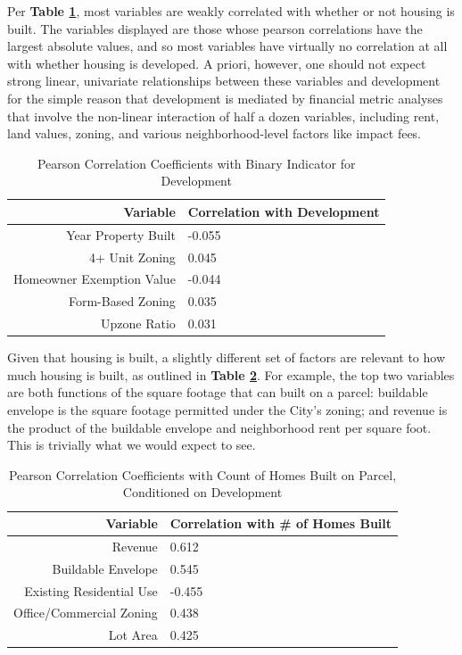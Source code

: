 \documentclass[a4paper,12pt]{article}
\begin{document}
Per \textbf{Table \ref{tab:correlation_with_developed}}, most variables are weakly correlated with whether or not housing is built. The variables displayed are those whose pearson correlations have the largest absolute values, and so most variables have virtually no correlation at all with whether housing is developed. A priori, however, one should not expect strong linear, univariate relationships between these variables and development for the simple reason that development is mediated by financial metric analyses that involve the non-linear interaction of half a dozen variables, including rent, land values, zoning, and various neighborhood-level factors like impact fees.\cite{la}\cite{metcalf2021will}




\renewcommand{\arraystretch}{1}

\begin{table}[hbt]
\centering
\caption{Pearson Correlation Coefficients with Binary Indicator for Development}
\setlength{\tabcolsep}{10pt} 
\begin{tabular}{r l}
\hline
\textbf{Variable} & \textbf{Correlation with Development} \\
\hline
Year Property Built & -0.055 \\
4+ Unit Zoning & 0.045 \\
Homeowner Exemption Value & -0.044 \\
Form-Based Zoning & 0.035 \\
Upzone Ratio & 0.031 \\
\hline
\end{tabular}
\label{tab:correlation_with_developed}
\end{table}
\renewcommand{\arraystretch}{1.5}

Given that housing is built, a slightly different set of factors are relevant to how much housing is built, as outlined in \textbf{Table \ref{tab:correlation_with_count_homes}}. For example, the top two variables are both functions of the square footage that can built on a parcel: buildable envelope is the square footage permitted under the City's zoning; and revenue is the product of the buildable envelope and neighborhood rent per square foot. This is trivially what we would expect to see.

\renewcommand{\arraystretch}{1}
\begin{table}[hbt]
\centering
\setlength{\tabcolsep}{10pt} 
\caption{Pearson Correlation Coefficients with Count of Homes Built on Parcel, Conditioned on Development}
\begin{tabular}{r l}
\hline
\textbf{Variable} & \textbf{Correlation with \# of Homes Built} \\
\hline
Revenue & 0.612 \\
Buildable Envelope & 0.545 \\
Existing Residential Use & -0.455 \\
Office/Commercial Zoning & 0.438 \\
Lot Area & 0.425 \\
\hline
\end{tabular}
\label{tab:correlation_with_count_homes}
\end{table}
\renewcommand{\arraystretch}{1.5}
\end{document}
